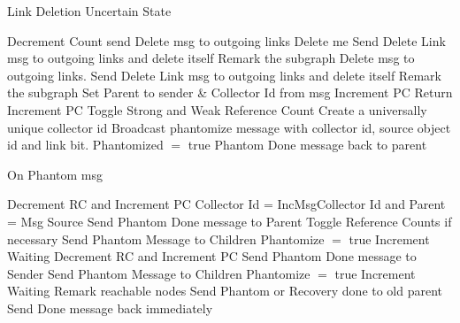 \documentclass{article}
\begin{document}
\begin{algorithm}
\caption{Link Deletion Uncertain State}
\label{Link Deletion}
\begin{algorithmic}[1]
\State Decrement Count
\State send Delete msg to outgoing links
\State Delete me
\State Send Delete Link msg to outgoing links and delete itself
\Else
\State Remark the subgraph
\EndIf
{}
\State Delete msg to outgoing links.
\State Send Delete Link msg to outgoing links and delete itself
\Else
\State Remark the subgraph
\EndIf
\Else
\State Set Parent to sender \& Collector Id from msg
\State Increment PC
\State Return
\State Increment PC
\State Toggle Strong and Weak Reference Count
\EndIf
\State Create a universally unique collector id
\State Broadcast phantomize message with collector id, source object id and link bit.
\EndFor
\State Phantomized $=$ true
\State Phantom Done message back to parent
\EndIf
\EndIf
\EndProcedure
\end{algorithmic}
\end{algorithm}	

\begin{algorithm}
\caption{On Phantom msg}
\label{Phantom message received}
\begin{algorithmic}[1]
\State Decrement RC and Increment PC
\State Collector Id = IncMsgCollector Id and Parent = Msg Source
\State Send Phantom Done message to Parent
\Else
\State Toggle Reference Counts if necessary
\State Send Phantom Message to Children
\State Phantomize $=$ true
\State Increment Waiting
\EndIf
{}
\State Decrement RC and Increment PC
\State Send Phantom Done message to Sender
\State Send Phantom Message to Children
\State Phantomize $=$ true
\State Increment Waiting
\EndIf
{}
\State Remark reachable nodes
\State Send Phantom or Recovery done to old parent
\Else
\State Send Done message back immediately
\EndIf
\EndProcedure
\end{algorithmic}
\end{algorithm}	
	
\end{document}
